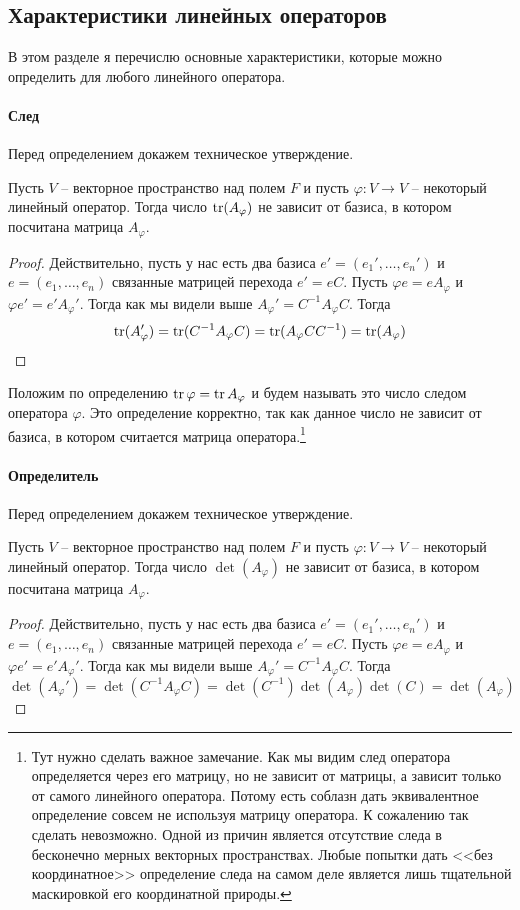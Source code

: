 \subsection{Характеристики линейных операторов}

В этом разделе я перечислю основные характеристики, которые можно определить для любого линейного оператора.

\paragraph{След} Перед определением докажем техническое утверждение.

\begin{claim*}
Пусть $V$ -- векторное пространство над полем $F$ и пусть $\varphi\colon V\to V$ -- некоторый линейный оператор. Тогда число $\operatorname{tr}(A_\varphi)$ не зависит от базиса, в котором посчитана матрица $A_\varphi$.
\end{claim*}
\begin{proof}
Действительно, пусть у нас есть два базиса $e' = (e_1',\ldots,e_n')$ и $e = (e_1,\ldots,e_n)$ связанные матрицей перехода $e' = eC$. Пусть $\varphi e = eA_\varphi$ и $\varphi e' = e' A_\varphi'$. Тогда как мы видели выше $A_\varphi' = C^{-1} A_\varphi C$. Тогда
\[
\operatorname{tr}(A_\varphi') = \operatorname{tr} (C^{-1}A_\varphi C) = \operatorname{tr}(A_\varphi C C^{-1}) = \operatorname{tr}(A_\varphi)
\]
\end{proof}

Положим по определению $\operatorname{tr}\varphi = \operatorname{tr} A_\varphi$ и будем называть это число следом оператора $\varphi$. Это определение корректно, так как данное число не зависит от базиса, в котором считается матрица оператора.\footnote{Тут нужно сделать важное замечание. Как мы видим след оператора определяется через его матрицу, но не зависит от матрицы, а зависит только от самого линейного оператора. Потому есть соблазн дать эквивалентное определение совсем не используя матрицу оператора. К сожалению так сделать невозможно. Одной из причин является отсутствие следа в бесконечно мерных векторных пространствах. Любые попытки дать <<без координатное>> определение следа на самом деле является лишь тщательной маскировкой его координатной природы.}

\paragraph{Определитель} Перед определением докажем техническое утверждение.

\begin{claim*}
Пусть $V$ -- векторное пространство над полем $F$ и пусть $\varphi\colon V\to V$ -- некоторый линейный оператор. Тогда число $\det(A_\varphi)$ не зависит от базиса, в котором посчитана матрица $A_\varphi$.
\end{claim*}
\begin{proof}
Действительно, пусть у нас есть два базиса $e' = (e_1',\ldots,e_n')$ и $e = (e_1,\ldots,e_n)$ связанные матрицей перехода $e' = eC$. Пусть $\varphi e = eA_\varphi$ и $\varphi e' = e' A_\varphi'$. Тогда как мы видели выше $A_\varphi' = C^{-1} A_\varphi C$. Тогда
\[
\det(A_\varphi') = \det (C^{-1}A_\varphi C) = \det(C^{-1})\det(A_\varphi)\det(C) =\det(A_\varphi)
\]
\end{proof}

